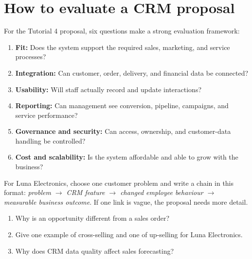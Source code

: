 \section{How to evaluate a CRM proposal}

For the Tutorial 4 proposal, six questions make a strong evaluation framework:

\begin{enumerate}
  \item \textbf{Fit:} Does the system support the required sales, marketing, and service processes?
  \item \textbf{Integration:} Can customer, order, delivery, and financial data be connected?
  \item \textbf{Usability:} Will staff actually record and update interactions?
  \item \textbf{Reporting:} Can management see conversion, pipeline, campaigns, and service performance?
  \item \textbf{Governance and security:} Can access, ownership, and customer-data handling be controlled?
  \item \textbf{Cost and scalability:} Is the system affordable and able to grow with the business?
\end{enumerate}

\begin{tryit}
For Luna Electronics, choose one customer problem and write a chain in this
format: \emph{problem $\rightarrow$ CRM feature $\rightarrow$ changed employee
behaviour $\rightarrow$ measurable business outcome}. If one link is vague, the
proposal needs more detail.
\end{tryit}

\begin{quickcheck}
\begin{enumerate}
  \item Why is an opportunity different from a sales order?
  \item Give one example of cross-selling and one of up-selling for Luna Electronics.
  \item Why does CRM data quality affect sales forecasting?
\end{enumerate}
\end{quickcheck}
